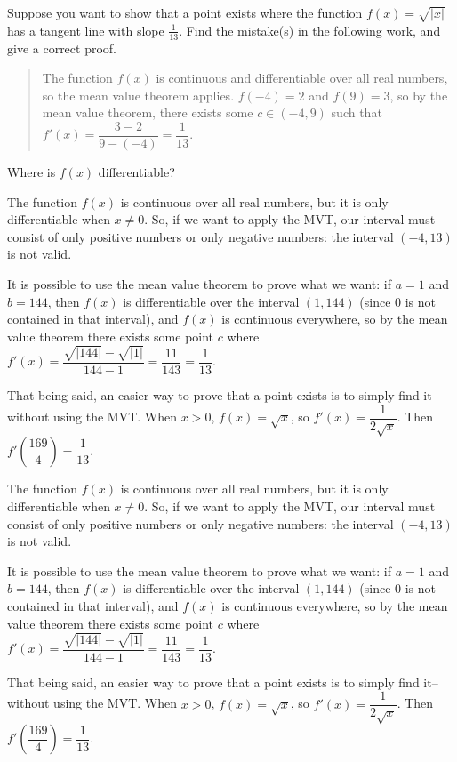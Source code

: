 \begin{question}
Suppose you want to show that a point exists where the function $f(x)=\sqrt{|x|}$ has a tangent line with slope $\frac{1}{13}$.
Find the mistake(s) in the following work, and give a correct proof.
\begin{quote}
The function $f(x)$ is continuous and differentiable over all real numbers, so the mean value theorem applies. $f(-4)=2$ and $f(9)=3$, so by the mean value theorem, there exists some $c \in (-4,9)$ such that
$f'(x) = \dfrac{3-2}{9-(-4)}=\dfrac{1}{13}$.
\end{quote}
\end{question}
\begin{hint}
Where is $f(x)$ differentiable?
\end{hint}
\begin{answer}
The function $f(x)$ is continuous over all real numbers, but it is only differentiable when $x \neq 0$. So, if we want to apply the MVT, our interval must consist of only positive numbers or only negative numbers: the interval $(-4,13)$ is not valid.

It is possible to use the mean value theorem to prove what we want: if $a=1$ and $b=144$, then $f(x)$ is differentiable over the interval $(1,144)$ (since 0 is not contained in that interval), and $f(x)$ is continuous everywhere, so by the mean value theorem there exists some point $c$ where $f'(x)=\dfrac{\sqrt{|144|}-\sqrt{|1|}}{144-1}=\dfrac{11}{143}=\dfrac{1}{13}$.

That being said, an easier way to prove that a point exists is to simply find it--without using the MVT. When $x>0$, $f(x)=\sqrt{x}$, so $f'(x)=\dfrac{1}{2\sqrt {x}}$. Then $f'\left(\dfrac{169}{4}\right)=\dfrac{1}{13}$.
\end{answer}
\begin{solution}
The function $f(x)$ is continuous over all real numbers, but it is only differentiable when $x \neq 0$. So, if we want to apply the MVT, our interval must consist of only positive numbers or only negative numbers: the interval $(-4,13)$ is not valid.

It is possible to use the mean value theorem to prove what we want: if $a=1$ and $b=144$, then $f(x)$ is differentiable over the interval $(1,144)$ (since 0 is not contained in that interval), and $f(x)$ is continuous everywhere, so by the mean value theorem there exists some point $c$ where $f'(x)=\dfrac{\sqrt{|144|}-\sqrt{|1|}}{144-1}=\dfrac{11}{143}=\dfrac{1}{13}$.

That being said, an easier way to prove that a point exists is to simply find it--without using the MVT. When $x>0$, $f(x)=\sqrt{x}$, so $f'(x)=\dfrac{1}{2\sqrt {x}}$. Then $f'\left(\dfrac{169}{4}\right)=\dfrac{1}{13}$.
\end{solution}



